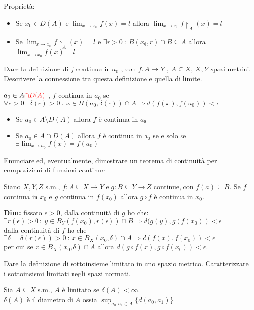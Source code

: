 \documentclass{exam}
\newcommand{\err}[1]{\textcolor{red}{#1}}
\begin{document}
\begin{questions}
\begin{solution}
    Proprietà:
    \begin{itemize}
        \item Se $x_0 \in D(A)$ e $\lim_{x \to x_0} f(x) = l$ allora $\lim_{x \to x_0} f\restriction_A (x) = l$
        \item Se $\lim_{x \to x_0} f\restriction_A (x) = l$ e $\exists r>0 \ : \ B(x_0,r) \cap B \subseteq A$ allora $\lim_{x \to x_0} f(x) = l$
    \end{itemize}
\end{solution}

\question Dare la definizione di $f$ continua in $a_0$ , con $f: A \rightarrow Y$ , $A \subseteq X$, $X , Y$ spazi metrici. Descrivere la connessione tra questa definizione e quella di limite.
\begin{solution}
    $a_0 \in A \err{\cap D(A)}$ , $f$ continua in $a_0$ se $\forall \epsilon > 0 \ \exists \delta(\epsilon)>0 \ :\  x \in B(a_0,\delta(\epsilon)) \cap A \Rightarrow d(f(x), f(a_0))<\epsilon$ 

    \begin{itemize}
        \item Se $a_0 \in A \setminus D(A)$ allora $f$ è continua in $a_0$
        \item Se $a_0 \in A \cap D(A)$ allora $f$ è continua in $a_0$ se e solo se $\exists \lim_{x\to a_0} f(x) = f(a_0)$
    \end{itemize}
\end{solution}

\question Enunciare ed, eventualmente, dimostrare un teorema di continuità per composizioni di funzioni continue.
\begin{solution}
    Siano $X,Y,Z$ s.m., $f: A \subseteq X \to Y$ e $g: B \subseteq Y \to Z$ continue, con $f(a) \subseteq B$. Se $f$ continua in $x_0$ e $g$ continua in $f(x_0)$ allora $g \circ f$ è continua in $x_0$.

    \textbf{Dim:} fissato $\epsilon>0$, dalla continuità di $g$ ho che:
    $\exists r(\epsilon)>0 \ : \ y \in B_Y(f(x_0), r(\epsilon)) \cap B \Rightarrow d(g(y), g(f(x_0)) < \epsilon$\\
    dalla continuità di $f$ ho che $\exists \delta = \delta(r(\epsilon)) > 0 \ : \ x \in B_X(x_0, \delta)\cap A \Rightarrow d(f(x), f(x_0))< \epsilon$\\
    per cui se $x \in B_X(x_0, \delta)\cap A$ allora $d(g \circ f(x), g \circ f(x_0))< \epsilon$.
\end{solution}

\question Dare la definizione di sottoinsieme limitato in uno spazio metrico. Caratterizzare i sottoinsiemi limitati negli spazi normati.
\begin{solution}
    Sia $A\subseteq X$ s.m., $A$ è limitato se $\delta(A)<\infty$.\\
    $\delta(A)$ è il diametro di $A$ ossia $\sup_{a_0,a_1 \in A} \{d(a_0,a_1)\}$
    

\end{solution}
\end{questions}
\end{document}
